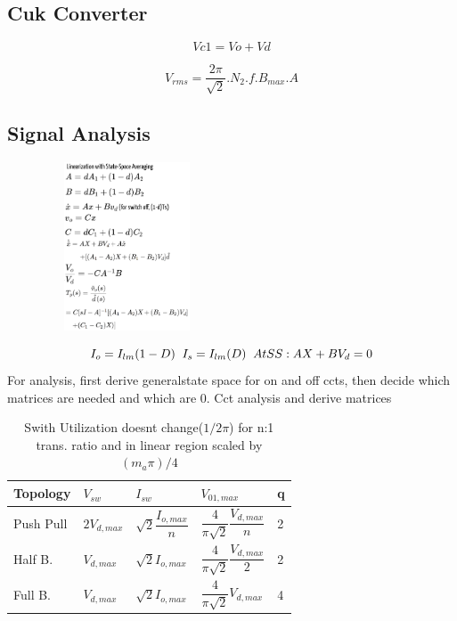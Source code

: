 \documentclass[twocolumn, ]{article}
\begin{document}
\subsection*{\small Cuk Converter}
\small
\begin{equation}
Vc1=Vo+Vd
\end{equation}



\begin{equation}
V_{rms}=\frac{2\pi}{\sqrt{2}}.N_{2}.f.B_{max}.A
\end{equation}

\subsection*{\small Signal Analysis}
 \begin{figure}[!ht]
	\includegraphics[width=5cm,height=5cm]{Small_Signal.png}
\end{figure}
\begin{equation*}
I_{o}=I_{lm}(1-D) 
\hspace{0.2cm}
I_{s}=I_{lm}(D)
\hspace{0.2cm}
At SS: AX+BV_{d}=0
\end{equation*}
For analysis, first derive generalstate space for on and off ccts, then decide which matrices are needed and which are 0. Cct analysis and derive matrices
\begin{table}[H]
\centering
\begin{tabular}{lllll}
    Topology & $V_{sw}$ & $I_{sw}$ & $V_{01,max}$ & q \\
    \hline

    Push Pull & $2V_{d,max}$ & $\sqrt2 \dfrac{I_{o,max}}{n}$ & $\dfrac{4}{\pi \sqrt2} \dfrac{V_{d,max}}{n}$ & 2 \\
    Half B. & $V_{d,max}$ & $\sqrt2 I_{o,max}$ & $\dfrac{4}{\pi \sqrt2} \dfrac{V_{d,max}}{2}$ & 2 \\
    Full B. & $V_{d,max}$ & $\sqrt2 I_{o,max}$ & $\dfrac{4}{\pi \sqrt2} V_{d,max}$ & 4 \\
 \end{tabular}   
  \caption{Swith Utilization doesnt change($1/2\pi$) for n:1 trans. ratio and in linear region scaled by $(m_{a}\pi)/4 $}
  
\end{table}
\end{document}
